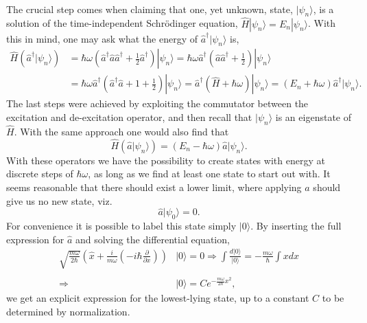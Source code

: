 \paragraph*{}
The crucial step comes when claiming that one, yet unknown, state, $|\psi_n \rangle$, is a solution of the time-independent Schrödinger equation, $\hat{H} |\psi_n \rangle = E_n |\psi_n \rangle$.
With this in mind, one may ask what the energy of $\hat{a}^{\dagger} |\psi_n\rangle$ is, 
\begin{equation}
\begin{split}
\hat{H}\left(\hat{a}^{\dagger}|\psi_n \rangle\right) &= 
\hbar \omega \left(\hat{a}^{\dagger}\hat{a}\hat{a}^{\dagger} + \frac{1}{2}\hat{a}^{\dagger} \right) |\psi_n \rangle = 
\hbar \omega \hat{a}^{\dagger} \left(\hat{a}\hat{a}^{\dagger} + \frac{1}{2} \right)|\psi_n \rangle \\
&= \hbar \omega \hat{a}^{\dagger} \left(\hat{a}^{\dagger}\hat{a} + 1 + \frac{1}{2} \right)|\psi_n \rangle 
= \hat{a}^{\dagger} \left(\hat{H} +\hbar \omega  \right)|\psi_n \rangle 
= \left(E_n +\hbar \omega  \right)\hat{a}^{\dagger}|\psi_n \rangle .
\end{split}
\end{equation}
The last steps were achieved by exploiting the commutator between the excitation and de-excitation operator, and then recall that $|\psi_n \rangle$ is an eigenstate of $\hat{H}$.
With the same approach one would also find that 
\begin{equation}
\hat{H}\left( \hat{a} |\psi_n \rangle \right) =
\left(E_n - \hbar \omega \right) \hat{a}|\psi_n\rangle .
\end{equation}
With these operators we have the possibility to create states with energy at discrete steps of $\hbar \omega$, as long as we find at least one state to start out with. It seems reasonable that there should exist a lower limit, where applying $\hat{a}$ should give us no new state, viz.
\begin{equation}
\hat{a} |\psi_0 \rangle = 0 .
\end{equation}
For convenience it is possible to label this state simply $|0\rangle$.
By inserting the full expression for $\hat{a}$ and solving the differential equation,
\begin{equation}
\begin{split}
\sqrt{\frac{m\omega}{2\hbar}} \left(\hat{x} + \frac{i}{m\omega}\left(-i\hbar \frac{\partial}{\partial x} \right)\right) &|0\rangle = 0
\Rightarrow 
\int \frac{d |0\rangle}{|0\rangle} = -\frac{m\omega}{\hbar}\int x dx
\\ \\ \Rightarrow 
&|0\rangle = C e^{-\frac{m\omega}{2\hbar} x^2} ,
\end{split}
\end{equation}
we get an explicit expression for the lowest-lying state, up to a constant $C$ to be determined by normalization.

